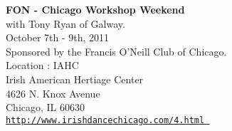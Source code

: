 \vspace{0pt}
{\large\textbf{FON - Chicago Workshop Weekend}}\\ 

with Tony Ryan of Galway.\\October 7th - 9th, 2011\\ Sponsored by the Francis O'Neill Club of Chicago.\\

\vspace*{0.5em}
Location : IAHC\\
Irish American Hertiage Center\\
4626 N. Knox Avenue\\
Chicago, IL  60630 \\

\href{http://www.irishdancechicago.com/4.html}{\tt http://www.irishdancechicago.com/4.html }
